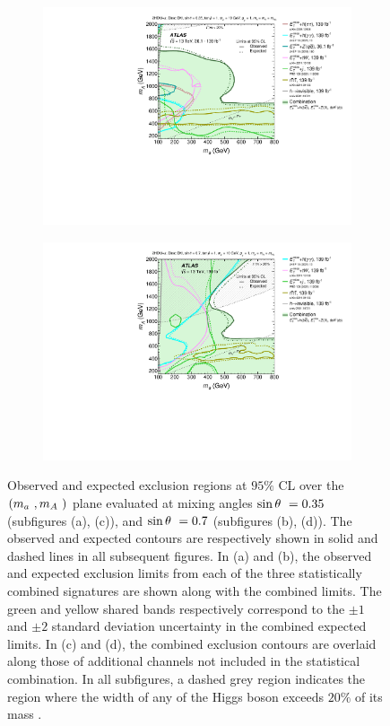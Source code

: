 \begin{figure}[h!]
\begin{subfigure}[2]{0.495\textwidth}
        \includegraphics[width=\linewidth]{figures/fig_04c.pdf}
        \caption{}
        \label{fig:result-ma-mA-scan-c}
    \end{subfigure}
    \begin{subfigure}[2]{0.495\textwidth}
        \centering
        \includegraphics[width=\linewidth]{figures/fig_04d.pdf}
        \caption{}
        \label{fig:result-ma-mA-scan-d}
    \end{subfigure}
    \caption{Observed and expected exclusion regions at $95\%$ CL over the $(m_a~, m_A~)$ plane evaluated at \thdma mixing angles $\sin\theta~=0.35$ (subfigures (a), (c)), and $\sin\theta~=0.7$ (subfigures (b), (d)). The observed and expected contours are respectively shown in solid and dashed lines in all subsequent figures. In (a) and (b), the observed and expected exclusion limits from each of the three statistically combined signatures are shown along with the combined limits. The green and yellow shared bands respectively correspond to the $\pm1$ and $\pm2$ standard deviation uncertainty in the combined expected limits. In (c) and (d), the combined exclusion contours are overlaid along those of additional channels not included in the statistical combination. In all subfigures, a dashed grey region indicates the region where the width of any of the Higgs boson exceeds $20\%$ of its mass \cite{2hdma_comb}. }
    \label{fig:result-ma-mA-scan}
\end{figure} 

